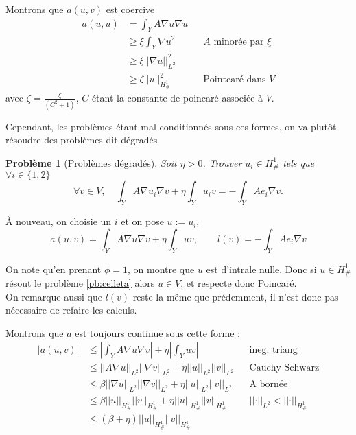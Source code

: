 \message{ !name(rapport.tex)}\documentclass[11pt]{article}
\newtheorem{pb}{Problème}
\newcommand{\norm}[1]{\left|\left|#1\right|\right|}
\newcommand{\Hd}{H^1_{\#}}
\begin{document}
Montrons que $a(u,v)$ est coercive
\begin{align*}
  a(u,u) &= \int_Y A \nabla u  \nabla u \\
         &\geq \xi \int_Y \nabla u^2  && \text{$A$ minorée par $\xi$}\\
         &\geq \xi \norm{\nabla u}^2_{L^2} \\
         &\geq \zeta \norm{u}^2_{\Hd} && \text{Pointcaré dans $V$} 
\end{align*}
avec $\zeta = \frac{\xi}{(C^2+1)}$, $C$ étant la constante de poincaré associée à $V$.

Cependant, les problèmes étant mal conditionnés sous ces formes, on va plutôt résoudre des problèmes dit dégradés 
\begin{pb}[Problèmes dégradés]
  \label{pb:celleta}
  Soit $\eta>0$. Trouver $u_i \in \Hd$ tels que $\forall i \in \{1,2\}$
  \begin{equation}
    \forall v \in V, \quad \int_Y A \nabla u_i \nabla v + \eta \int_Y u_i v = - \int_Y A e_i \nabla v.
  \end{equation}
\end{pb}

À nouveau, on choisie un $i$ et on pose $u:=u_i$, 
\[
  a(u,v) = \int_Y A \nabla u \nabla v + \eta \int_Y u v, \qquad
  l(v) = -\int_Y A e_i \nabla v
\]

On note qu'en prenant $\phi=1$, on montre que $u$ est d'intrale nulle. Donc si $u\in\Hd$ résout le problème  \autoref{pb:celleta} alors $u\in V$, et respecte donc Poincaré.  \\
On remarque aussi que $l(v)$ reste la même que prédemment, il n'est donc pas nécessaire de refaire les calculs. 

Montrons que $a$ est toujours continue sous cette forme :
\begin{align*}
  \big|a(u,v)\big| &\leq \left| \int_Y A \nabla u \nabla v \right| + \eta \left| \int_Y  u v \right| && \mbox{ineg. triang} \\
                   &\leq \norm{A\nabla u}_{L^2} \norm{\nabla v}_{L^2} + \eta \norm{u}_{L^2} \norm{v}_{L^2} && \mbox{Cauchy Schwarz} \\
                   &\leq \beta \norm{\nabla u}_{L^2} \norm{\nabla v}_{L^2} + \eta \norm{u}_{L^2} \norm{v}_{L^2} && \mbox{A bornée} \\
                   &\leq \beta \norm{u}_{\Hd} \norm{v}_{\Hd} + \eta \norm{u}_{\Hd} \norm{v}_{\Hd} && \norm{\cdot}_{L^2}<\norm{\cdot}_{\Hd} \\
                   &\leq (\beta + \eta) \norm{u}_{\Hd} \norm{v}_{\Hd}
\end{align*}
\end{document}
